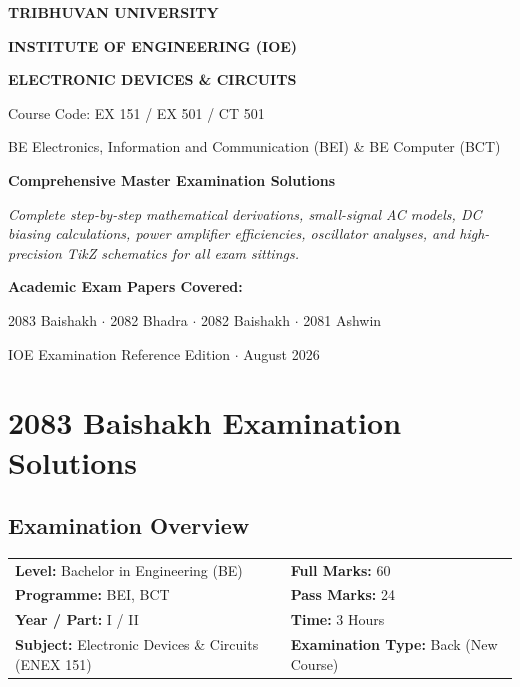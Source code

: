 \documentclass[11pt,a4paper,oneside]{book}
\begin{document}
\begin{titlepage}
  \centering
  \vspace*{1.5cm}
  {\Huge \bfseries \color{primarydark} TRIBHUVAN UNIVERSITY\par}
  \vspace{0.4cm}
  {\Large \bfseries \color{secondaryblue} INSTITUTE OF ENGINEERING (IOE)\par}
  \vspace{1.5cm}
  {\Huge \bfseries \color{accentindigo} ELECTRONIC DEVICES \& CIRCUITS\par}
  \vspace{0.5cm}
  {\LARGE Course Code: EX 151 / EX 501 / CT 501\par}
  \vspace{0.3cm}
  {\large BE Electronics, Information and Communication (BEI) \& BE Computer (BCT)\par}
  \vspace{2.0cm}
  
  \begin{tcolorbox}[colback=boxbg,colframe=alertborder,width=0.88\textwidth,arc=3mm,center]
    \centering
    \Large \textbf{Comprehensive Master Examination Solutions}\par
    \vspace{0.3cm}
    \normalsize \textit{Complete step-by-step mathematical derivations, small-signal AC models, DC biasing calculations, power amplifier efficiencies, oscillator analyses, and high-precision TikZ schematics for all exam sittings.}
  \end{tcolorbox}
  
  \vfill
  {\large \textbf{Academic Exam Papers Covered:}\par}
  {\normalsize 2083 Baishakh $\cdot$ 2082 Bhadra $\cdot$ 2082 Baishakh $\cdot$ 2081 Ashwin\par}
  \vspace{1.0cm}
  {\small IOE Examination Reference Edition $\cdot$ August 2026\par}
\end{titlepage}

\tableofcontents
\newpage

\chapter{2083 Baishakh Examination Solutions}

\section*{Examination Overview}
\begin{tabular}{@{}ll@{}}
\textbf{Level:} Bachelor in Engineering (BE) & \textbf{Full Marks:} 60 \\
\textbf{Programme:} BEI, BCT & \textbf{Pass Marks:} 24 \\
\textbf{Year / Part:} I / II & \textbf{Time:} 3 Hours \\
\textbf{Subject:} Electronic Devices \& Circuits (ENEX 151) & \textbf{Examination Type:} Back (New Course) \\
\end{tabular}
\end{document}
